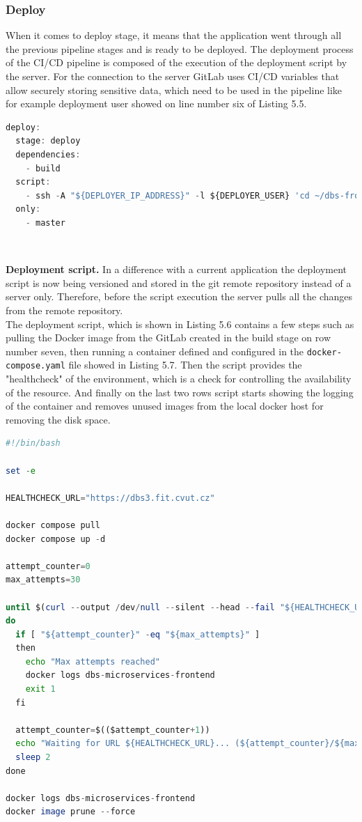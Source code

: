 \subsubsection{Deploy} When it comes to deploy stage, it means that the application went through all the previous pipeline stages and is ready to be deployed. The deployment process of the CI/CD pipeline is composed of the execution of the deployment script by the server. For the connection to the server GitLab uses CI/CD variables that allow securely storing sensitive data, which need to be used in the pipeline like for example deployment user showed on line number six of Listing 5.5.


\begin{lstlisting}[language=Octave, caption=Deploy stage in the CI/CD pipeline]
deploy:
  stage: deploy
  dependencies:
    - build
  script:
    - ssh -A "${DEPLOYER_IP_ADDRESS}" -l ${DEPLOYER_USER} 'cd ~/dbs-frontend && git pull && cd ./.docker/server && bash deploy-dbs-frontend.sh'
  only:
    - master
\end{lstlisting}

\

\noindent \textbf{Deployment script.} In a difference with a current application the deployment script is now being versioned and stored in the git remote repository instead of a server only. Therefore, before the script execution the server pulls all the changes from the remote repository.\\ The deployment script, which is shown in Listing 5.6 contains a few steps such as pulling the Docker image from the GitLab created in the build stage on row number seven, then running a container defined and configured in the \texttt{docker-compose.yaml} file showed in Listing 5.7. Then the script provides the "healthcheck" of the environment, which is a check for controlling the availability of the resource. And finally on the last two rows script starts showing the logging of the container and removes unused images from the local docker host for removing the disk space.

\begin{lstlisting}[language=Octave, caption=Deployment script]
#!/bin/bash

set -e

HEALTHCHECK_URL="https://dbs3.fit.cvut.cz"

docker compose pull
docker compose up -d

attempt_counter=0
max_attempts=30

until $(curl --output /dev/null --silent --head --fail "${HEALTHCHECK_URL}")
do
  if [ "${attempt_counter}" -eq "${max_attempts}" ]
  then
    echo "Max attempts reached"
    docker logs dbs-microservices-frontend
    exit 1
  fi

  attempt_counter=$(($attempt_counter+1))
  echo "Waiting for URL ${HEALTHCHECK_URL}... (${attempt_counter}/${max_attempts})"
  sleep 2
done

docker logs dbs-microservices-frontend
docker image prune --force
\end{lstlisting}

